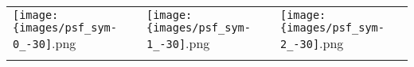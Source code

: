  \begin{tabular}{lll}
\texttt{[image: \{images/psf\_sym-0\_-30]}.png} &\texttt{[image: \{images/psf\_sym-1\_-30]}.png} &\texttt{[image: \{images/psf\_sym-2\_-30]}.png} 
 \\ \hfill\end{tabular}